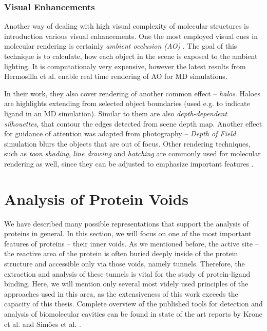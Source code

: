 \subsubsection{Visual Enhancements}
Another way of dealing with high visual complexity of molecular structures is introduction various visual enhancements. One the most employed visual cues in molecular rendering is certainly \textit{ambient occlusion (AO)} \cite{miller1994efficient}. The goal of this technique is to calculate, how each object in the scene is exposed to the ambient lighting. It is computationaly very expensive, however the latest results from Hermosilla et al. \cite{hermosilla2016high} enable real time rendering of AO for MD simulations.

In their work, they also cover rendering of another common effect -- \textit{halos}. Haloes are highlights extending from selected object boundaries (used e.g. to indicate ligand in an MD simulation). Similar to them are also \textit{depth-dependent silhouettes}, that contour the edges  detected from scene depth map. Another effect for guidance of attention was adapted from photography -- \textit{Depth of Field} simulation blurs the objects that are out of focus. 
Other rendering techniques, such as \textit{toon shading}, \textit{line drawing} and \textit{hatching} are commonly used for molecular rendering as well, since they can be adjusted to emphasize important features \cite{kozlikova2015visualization}.


\section{Analysis of Protein Voids}
We have described many possible representations that support the analysis of proteins in general. In this section, we will focus on one of the most important features of proteins -- their inner voids. As we mentioned before, the active site -- the reactive area of the protein is often buried deeply inside of the protein structure and accessible only via those voids, namely tunnels. Therefore, the extraction and analysis of these tunnels is vital for the study of protein-ligand binding. Here, we will mention only several most videly used principles of the approaches used in this area, as the extensiveness of this work exceeds the capacity of this thesis. Complete overview of the published tools for detection and analysis of biomolecular cavities can be found in state of the art reports by Krone et al. \cite{krone2016visual} and Simões et al. \cite{simoesgeometric}.

